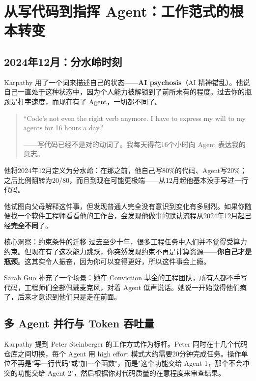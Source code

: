 \section{从写代码到指挥 Agent：工作范式的根本转变}

\subsection{2024年12月：分水岭时刻}

Karpathy 用了一个词来描述自己的状态——\textbf{AI psychosis}（AI 精神错乱）。他说自己一直处于这种状态中，因为个人能力被解锁到了前所未有的程度。过去你的瓶颈是打字速度，而现在有了 Agent，一切都不同了。

\begin{quote}
``Code's not even the right verb anymore. I have to express my will to my agents for 16 hours a day.''

——写代码已经不是对的动词了。我每天得花16个小时向 Agent 表达我的意志。
\end{quote}

他将2024年12月定义为分水岭：在那之前，他自己写80\%的代码、Agent写20\%；之后比例翻转为20/80，而且到现在可能更极端——从12月起他基本没手写过一行代码。

他试图向父母解释这件事，但发现普通人完全没有意识到变化有多剧烈。如果你随便找一个软件工程师看看他的工作台，会发现他做事的默认流程从2024年12月起已经\textbf{完全不同}了。

\begin{importantbox}{核心洞察：约束条件的迁移}
过去至少十年，很多工程任务中人们并不觉得受算力约束。但现在有了这次能力跳跃，你突然发现约束不再是计算资源——\textbf{你自己才是瓶颈}。这其实令人振奋，因为你可以变得更好，所以这件事会上瘾。
\end{importantbox}

Sarah Guo 补充了一个场景：她在 Conviction 基金的工程团队，所有人都不手写代码，工程师们全部佩戴麦克风，对着 Agent 低声说话。她说一开始觉得他们疯了，后来才意识到他们只是走在前面。

\subsection{多 Agent 并行与 Token 吞吐量}

Karpathy 提到 Peter Steinberger 的工作方式作为标杆。Peter 同时在十几个代码仓库之间切换，每个 Agent 用 high effort 模式大约需要20分钟完成任务。操作单位不再是"写一行代码"或"加一个函数"，而是"这个功能交给 Agent 1，那个不会冲突的功能交给 Agent 2"，然后根据你对代码质量的在意程度来审查结果。

